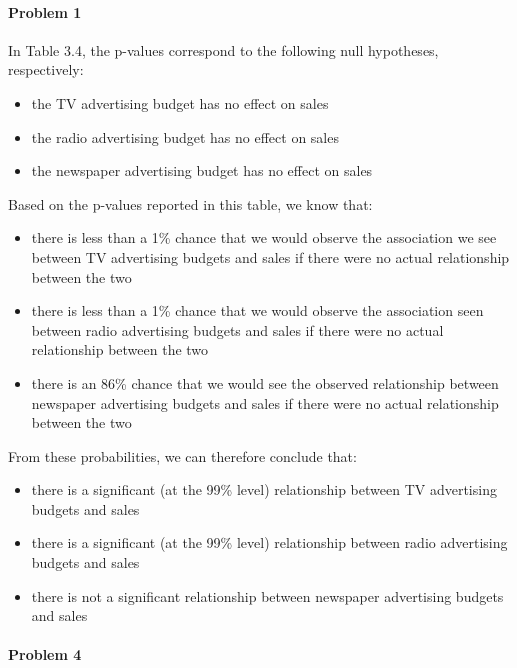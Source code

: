 \documentclass[]{article}
\providecommand{\tightlist}{%
  \setlength{\itemsep}{0pt}\setlength{\parskip}{0pt}}
\let\oldparagraph\paragraph
\renewcommand{\paragraph}[1]{\oldparagraph{#1}\mbox{}}
\begin{document}
\paragraph{Problem 1}\label{problem-1}

In Table 3.4, the p-values correspond to the following null hypotheses,
respectively:

\begin{itemize}
\tightlist
\item
  the TV advertising budget has no effect on sales
\item
  the radio advertising budget has no effect on sales
\item
  the newspaper advertising budget has no effect on sales
\end{itemize}

Based on the p-values reported in this table, we know that:

\begin{itemize}
\tightlist
\item
  there is less than a 1\% chance that we would observe the association
  we see between TV advertising budgets and sales if there were no
  actual relationship between the two
\item
  there is less than a 1\% chance that we would observe the association
  seen between radio advertising budgets and sales if there were no
  actual relationship between the two
\item
  there is an 86\% chance that we would see the observed relationship
  between newspaper advertising budgets and sales if there were no
  actual relationship between the two
\end{itemize}

From these probabilities, we can therefore conclude that:

\begin{itemize}
\tightlist
\item
  there is a significant (at the 99\% level) relationship between TV
  advertising budgets and sales
\item
  there is a significant (at the 99\% level) relationship between radio
  advertising budgets and sales
\item
  there is not a significant relationship between newspaper advertising
  budgets and sales
\end{itemize}

\paragraph{Problem 4}\label{problem-4}
\end{document}
